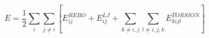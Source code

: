 \documentclass[12pt]{article}
\begin{document}
$$ 
  E = \frac{1}{2} \sum_i \sum_{j \neq i} 
  \left[ E^{REBO}_{ij} + E^{LJ}_{ij} + 
    \sum_{k \neq i,j} \sum_{l \neq i,j,k} E^{TORSION}_{kijl} \right] 
$$
\end{document}

